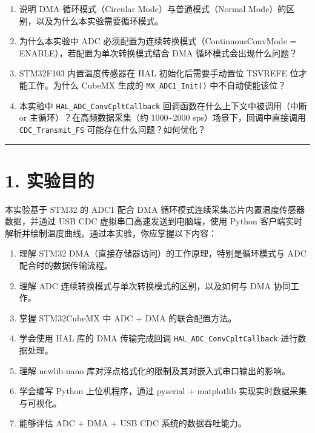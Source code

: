 \documentclass[
  chinese,
  UTF8,
  oneside,
  openany]{ctexbook}
\providecommand{\tightlist}{%
  \setlength{\itemsep}{0pt}\setlength{\parskip}{0pt}}
\begin{document}
\begin{enumerate}
\def\labelenumi{\arabic{enumi}.}
\tightlist
\item
  说明 DMA 循环模式（Circular Mode）与普通模式（Normal
  Mode）的区别，以及为什么本实验需要循环模式。
\item
  为什么本实验中 ADC 必须配置为连续转换模式（ContinuousConvMode =
  ENABLE），若配置为单次转换模式结合 DMA 循环模式会出现什么问题？
\item
  STM32F103 内置温度传感器在 HAL 初始化后需要手动置位 TSVREFE
  位才能工作。为什么 CubeMX 生成的 \texttt{MX\_ADC1\_Init()}
  中不自动使能该位？
\item
  本实验中 \texttt{HAL\_ADC\_ConvCpltCallback}
  回调函数在什么上下文中被调用（中断 or 主循环）？在高频数据采集（约
  1000\textasciitilde2000 sps）场景下，回调中直接调用
  \texttt{CDC\_Transmit\_FS} 可能存在什么问题？如何优化？
\end{enumerate}

\begin{center}\rule{0.5\linewidth}{0.5pt}\end{center}

\section{1. 实验目的}\label{ux5b9eux9a8cux76eeux7684-2}

本实验基于 STM32 的 ADC1 配合 DMA
循环模式连续采集芯片内置温度传感器数据，并通过 USB CDC
虚拟串口高速发送到电脑端，使用 Python
客户端实时解析并绘制温度曲线。通过本实验，你应掌握以下内容：

\begin{enumerate}
\def\labelenumi{\arabic{enumi}.}
\tightlist
\item
  理解 STM32 DMA（直接存储器访问）的工作原理，特别是循环模式与 ADC
  配合时的数据传输流程。
\item
  理解 ADC 连续转换模式与单次转换模式的区别，以及如何与 DMA 协同工作。
\item
  掌握 STM32CubeMX 中 ADC + DMA 的联合配置方法。
\item
  学会使用 HAL 库的 DMA 传输完成回调 \texttt{HAL\_ADC\_ConvCpltCallback}
  进行数据处理。
\item
  理解 newlib-nano 库对浮点格式化的限制及其对嵌入式串口输出的影响。
\item
  学会编写 Python 上位机程序，通过 pyserial + matplotlib
  实现实时数据采集与可视化。
\item
  能够评估 ADC + DMA + USB CDC 系统的数据吞吐能力。
\end{enumerate}
\end{document}
